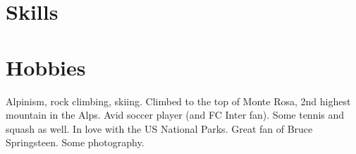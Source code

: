 \documentclass[a4paper]{moderncv}
\begin{document}
%
%
%
%
%
%
%
%

\section{Skills}


\section{Hobbies}
Alpinism, rock climbing, skiing. Climbed to the top of Monte Rosa, 2nd highest mountain in the Alps.
\newline{}
Avid soccer player (and FC Inter fan). Some tennis and squash as well. In love with the US National Parks.
\newline{}
Great fan of Bruce Springsteen. Some photography.%
\end{document}
